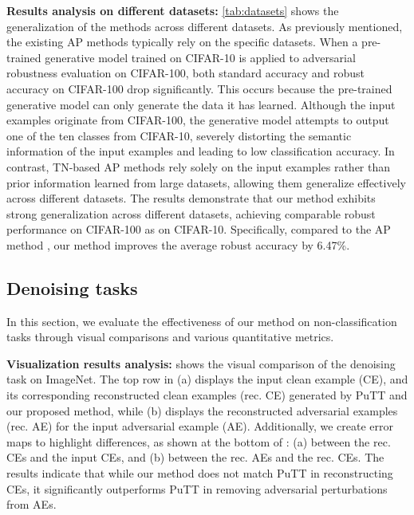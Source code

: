 \textbf{Results analysis on different datasets:} \cref{tab:datasets} shows the generalization of the methods across different datasets. As previously mentioned, the existing AP methods typically rely on the specific datasets. When a pre-trained generative model trained on CIFAR-10 is applied to adversarial robustness evaluation on CIFAR-100, both standard accuracy and robust accuracy on CIFAR-100 drop significantly. This occurs because the pre-trained generative model can only generate the data it has learned. Although the input examples originate from CIFAR-100, the generative model attempts to output one of the ten classes from CIFAR-10, severely distorting the semantic information of the input examples and leading to low classification accuracy. In contrast, TN-based AP methods rely solely on the input examples rather than prior information learned from large datasets, allowing them generalize effectively across different datasets. The results demonstrate that our method exhibits strong generalization across different datasets, achieving comparable robust performance on CIFAR-100 as on CIFAR-10. Specifically, compared to the AP method \citep{nie2022diffusion}, our method improves the average robust accuracy by 6.47\%.


\subsection{Denoising tasks}
\label{Denoising tasks}

In this section, we evaluate the effectiveness of our method on non-classification tasks through visual comparisons and various quantitative metrics.

\textbf{Visualization results analysis:}  shows the visual comparison of the denoising task on ImageNet. The top row in (a) displays the input clean example (CE), and its corresponding reconstructed clean examples (rec. CE) generated by PuTT and our proposed method, while (b) displays the reconstructed adversarial examples (rec. AE) for the input adversarial example (AE).
Additionally, we create error maps to highlight differences, as shown at the bottom of : (a) between the rec. CEs and the input CEs, and (b) between the rec. AEs and the rec. CEs. The results indicate that while our method does not match PuTT in reconstructing CEs, it significantly outperforms PuTT in removing adversarial perturbations from AEs.

